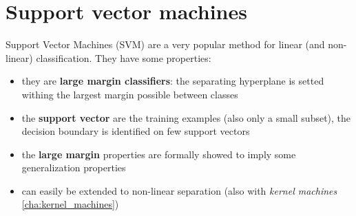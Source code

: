 \chapter{Support vector machines}
\label{cha:SVMs}

Support Vector Machines (SVM) are a very popular method for linear (and non-linear) classification. They have some properties:
\begin{itemize}
    \item they are \textbf{large margin classifiers}: the separating hyperplane is setted withing the largest margin possible between classes
    \item the \textbf{support vector} are the training examples (also only a small subset), the decision boundary is identified on few support vectors
    \item the \textbf{large margin} properties are formally showed to imply some generalization properties
    \item can easily be extended to non-linear separation (also with \textit{kernel machines} \ref{cha:kernel_machines})
\end{itemize}

